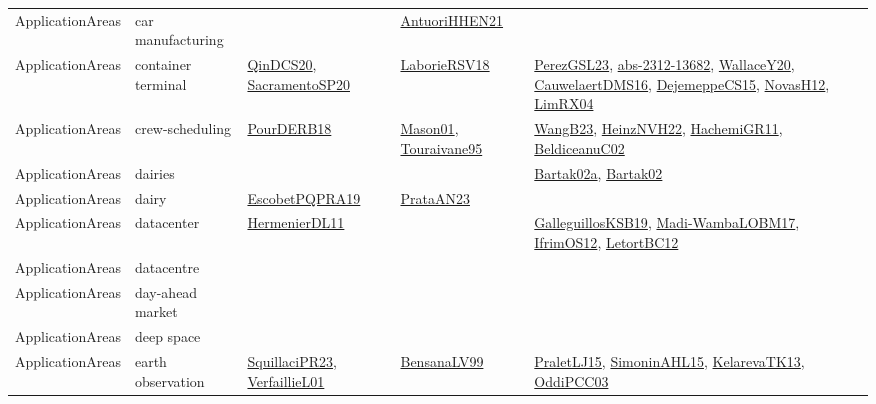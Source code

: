 {\begin{longtable}{lp{3cm}>{\raggedright}p{6cm}>{\raggedright}p{6cm}p{8cm}}
ApplicationAreas & car manufacturing &  & \href{papers/AntuoriHHEN21.pdf}{AntuoriHHEN21}\cite{AntuoriHHEN21} & \\
ApplicationAreas & container terminal & \href{articles/QinDCS20.pdf}{QinDCS20}\cite{QinDCS20}, \href{articles/SacramentoSP20.pdf}{SacramentoSP20}\cite{SacramentoSP20} & \href{articles/LaborieRSV18.pdf}{LaborieRSV18}\cite{LaborieRSV18} & \href{papers/PerezGSL23.pdf}{PerezGSL23}\cite{PerezGSL23}, \href{articles/abs-2312-13682.pdf}{abs-2312-13682}\cite{abs-2312-13682}, \href{articles/WallaceY20.pdf}{WallaceY20}\cite{WallaceY20}, \href{papers/CauwelaertDMS16.pdf}{CauwelaertDMS16}\cite{CauwelaertDMS16}, \href{papers/DejemeppeCS15.pdf}{DejemeppeCS15}\cite{DejemeppeCS15}, \href{articles/NovasH12.pdf}{NovasH12}\cite{NovasH12}, \href{papers/LimRX04.pdf}{LimRX04}\cite{LimRX04}\\
ApplicationAreas & crew-scheduling & \href{articles/PourDERB18.pdf}{PourDERB18}\cite{PourDERB18} & \href{articles/Mason01.pdf}{Mason01}\cite{Mason01}, \href{papers/Touraivane95.pdf}{Touraivane95}\cite{Touraivane95} & \href{papers/WangB23.pdf}{WangB23}\cite{WangB23}, \href{articles/HeinzNVH22.pdf}{HeinzNVH22}\cite{HeinzNVH22}, \href{articles/HachemiGR11.pdf}{HachemiGR11}\cite{HachemiGR11}, \href{papers/BeldiceanuC02.pdf}{BeldiceanuC02}\cite{BeldiceanuC02}\\
ApplicationAreas & dairies &  &  & \href{papers/Bartak02a.pdf}{Bartak02a}\cite{Bartak02a}, \href{papers/Bartak02.pdf}{Bartak02}\cite{Bartak02}\\
ApplicationAreas & dairy & \href{articles/EscobetPQPRA19.pdf}{EscobetPQPRA19}\cite{EscobetPQPRA19} & \href{articles/PrataAN23.pdf}{PrataAN23}\cite{PrataAN23} & \\
ApplicationAreas & datacenter & \href{papers/HermenierDL11.pdf}{HermenierDL11}\cite{HermenierDL11} &  & \href{papers/GalleguillosKSB19.pdf}{GalleguillosKSB19}\cite{GalleguillosKSB19}, \href{papers/Madi-WambaLOBM17.pdf}{Madi-WambaLOBM17}\cite{Madi-WambaLOBM17}, \href{papers/IfrimOS12.pdf}{IfrimOS12}\cite{IfrimOS12}, \href{papers/LetortBC12.pdf}{LetortBC12}\cite{LetortBC12}\\
ApplicationAreas & datacentre &  &  & \\
ApplicationAreas & day-ahead market &  &  & \\
ApplicationAreas & deep space &  &  & \\
ApplicationAreas & earth observation & \href{papers/SquillaciPR23.pdf}{SquillaciPR23}\cite{SquillaciPR23}, \href{papers/VerfaillieL01.pdf}{VerfaillieL01}\cite{VerfaillieL01} & \href{articles/BensanaLV99.pdf}{BensanaLV99}\cite{BensanaLV99} & \href{papers/PraletLJ15.pdf}{PraletLJ15}\cite{PraletLJ15}, \href{articles/SimoninAHL15.pdf}{SimoninAHL15}\cite{SimoninAHL15}, \href{papers/KelarevaTK13.pdf}{KelarevaTK13}\cite{KelarevaTK13}, \href{papers/OddiPCC03.pdf}{OddiPCC03}\cite{OddiPCC03}\\

\end{longtable}}
